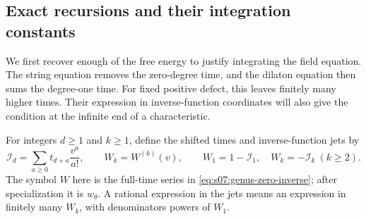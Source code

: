 \subsection{Exact recursions and their integration constants}
\label{subsec:s07:03}

We first recover enough of the free energy to justify integrating the
field equation. The string equation removes the zero-degree time, and
the dilaton equation then sums the degree-one time. For fixed positive
defect, this leaves finitely many higher times. Their expression in
inverse-function coordinates will also give the condition at the
infinite end of a characteristic.

For integers $d\geq1$ and $k\geq1$, define the shifted times and
inverse-function jets by
\begin{equation}\label{eq:s07:jets}
 \mathcal I_d=\sum_{a\geq0}t_{d+a}\frac{v^a}{a!},\qquad
 W_k=W^{(k)}(v),\qquad
 W_1=1-\mathcal I_1,\quad W_k=-\mathcal I_k\ (k\geq2).
\end{equation}
The symbol $W$ here is the full-time series in
\eqref{eq:s07:genus-zero-inverse}; after specialization it is
$w_\theta$. A rational expression in the jets means an expression in
finitely many $W_k$, with denominators powers of $W_1$.

